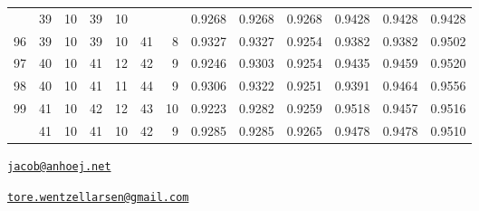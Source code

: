 \begin{Schunk}
\begin{longtable}{rrrrrrrrrrrrr}
\addlinespace
95 & 39 & 10 & 39 & 10 &  &  & 0.9268 & 0.9268 & 0.9268 & 0.9428 & 0.9428 & 0.9428\\
96 & 39 & 10 & 39 & 10 & 41 & 8 & 0.9327 & 0.9327 & 0.9254 & 0.9382 & 0.9382 & 0.9502\\
97 & 40 & 10 & 41 & 12 & 42 & 9 & 0.9246 & 0.9303 & 0.9254 & 0.9435 & 0.9459 & 0.9520\\
98 & 40 & 10 & 41 & 11 & 44 & 9 & 0.9306 & 0.9322 & 0.9251 & 0.9391 & 0.9464 & 0.9556\\
99 & 41 & 10 & 42 & 12 & 43 & 10 & 0.9223 & 0.9282 & 0.9259 & 0.9518 & 0.9457 & 0.9516\\
\addlinespace
100 & 41 & 10 & 41 & 10 & 42 & 9 & 0.9285 & 0.9285 & 0.9265 & 0.9478 & 0.9478 & 0.9510\\*
\end{longtable}

\end{Schunk}

\normalsize


\address{%
Jacob Anhøj\\
Rigshospitalet, University of Copenhagen\\
Denmark\\
}
\href{mailto:jacob@anhoej.net}{\nolinkurl{jacob@anhoej.net}}

\address{%
Tore Wentzel-Larsen\\
Centre for Child and Adolescent Mental Health, Eastern and Southern
Norway \& Centre for Violence and Traumatic Stress Studies, Oslo, Norway\\
Norway\\
}
\href{mailto:tore.wentzellarsen@gmail.com}{\nolinkurl{tore.wentzellarsen@gmail.com}}

